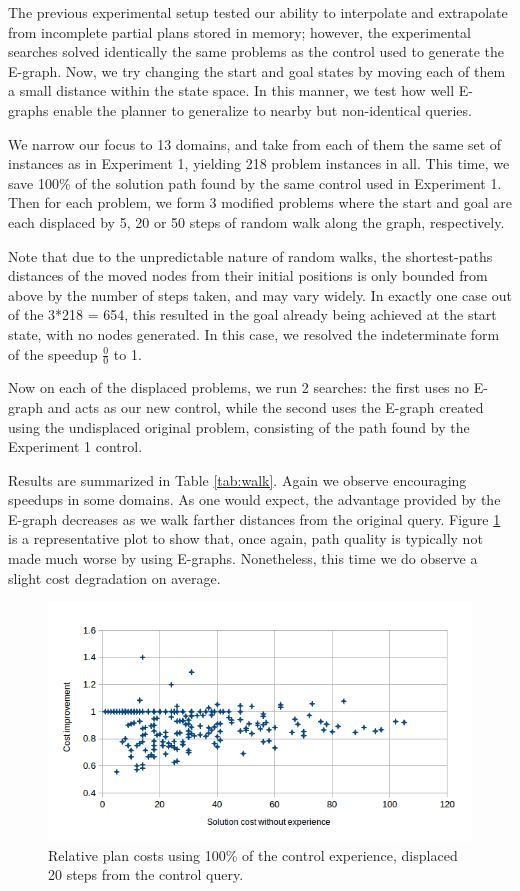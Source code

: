 \documentclass[letterpaper]{article}
\begin{document}
The previous experimental setup tested our ability to interpolate and extrapolate from incomplete partial plans stored in memory; however, the experimental searches solved identically the same problems as the control used to generate the E-graph.
Now, we try changing the start and goal states by moving each of them a small distance within the state space. 
In this manner, we test how well E-graphs enable the planner to generalize to nearby but non-identical queries.

We narrow our focus to 13 domains, and take from each of them the same set of instances as in Experiment 1, yielding 218 problem instances in all.
This time, we save 100\% of the solution path found by the same control used in Experiment 1.
Then for each problem, we form 3 modified problems where the start and goal are each displaced by 5, 20 or 50 steps of random walk along the graph, respectively.

Note that due to the unpredictable nature of random walks, the shortest-paths distances of the moved nodes from their initial positions is only bounded from above by the number of steps taken, and may vary widely.
In exactly one case out of the 3*218 = 654, this resulted in the goal already being achieved at the start state, with no nodes generated. In this case, we resolved the indeterminate form of the speedup $\frac 00$ to 1.

Now on each of the displaced problems, we run 2 searches: the first uses no E-graph and acts as our new control, while the second uses the E-graph created using the undisplaced original problem, consisting of the path found by the Experiment 1 control.

Results are summarized in Table \ref{tab:walk}.
Again we observe encouraging speedups in some domains. As one would expect, the advantage provided by the E-graph decreases as we walk farther distances from the original query. Figure \ref{fig:c_100_20} is a representative plot to show that, once again, path quality is typically not made much worse by using E-graphs. Nonetheless, this time we do observe a slight cost degradation on average.

\begin{figure}
	\centering
	\includegraphics[scale=0.5]{Cost_100_20.png}
	\caption{Relative plan costs using 100\% of the control experience, displaced 20 steps from the control query.}
	 \label{fig:c_100_20}
\end{figure}
\end{document}
